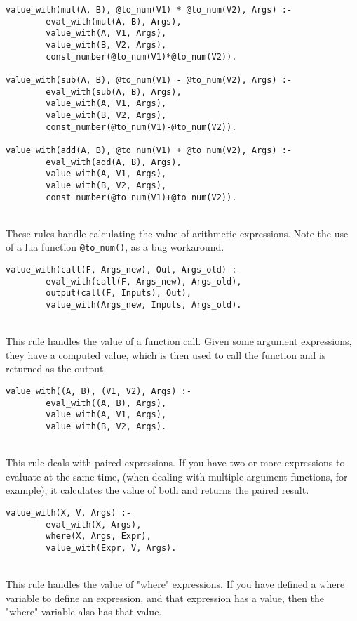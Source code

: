 \begin{lstlisting}
value_with(mul(A, B), @to_num(V1) * @to_num(V2), Args) :- 
		eval_with(mul(A, B), Args), 
		value_with(A, V1, Args), 
		value_with(B, V2, Args), 
		const_number(@to_num(V1)*@to_num(V2)).
		
value_with(sub(A, B), @to_num(V1) - @to_num(V2), Args) :- 
		eval_with(sub(A, B), Args), 
		value_with(A, V1, Args), 
		value_with(B, V2, Args), 
		const_number(@to_num(V1)-@to_num(V2)).
		
value_with(add(A, B), @to_num(V1) + @to_num(V2), Args) :- 
		eval_with(add(A, B), Args), 
		value_with(A, V1, Args), 
		value_with(B, V2, Args), 
		const_number(@to_num(V1)+@to_num(V2)).
\end{lstlisting}
\mbox{} \\
These rules handle calculating the value of arithmetic expressions. Note the use of a lua function \lstinline{@to_num()}, as a bug workaround. \\%

\begin{lstlisting}
value_with(call(F, Args_new), Out, Args_old) :- 
		eval_with(call(F, Args_new), Args_old), 
		output(call(F, Inputs), Out), 
		value_with(Args_new, Inputs, Args_old).
\end{lstlisting}
\mbox{} \\
This rule handles the value of a function call. Given some argument expressions, they have a computed value, which is then used to call the function and is returned as the output. \\

\begin{lstlisting}
value_with((A, B), (V1, V2), Args) :- 
		eval_with((A, B), Args), 
		value_with(A, V1, Args), 
		value_with(B, V2, Args).
\end{lstlisting}
\mbox{} \\
This rule deals with paired expressions. If you have two or more expressions to evaluate at the same time, (when dealing with multiple-argument functions, for example), it calculates the value of both and returns the paired result. \\

\begin{lstlisting}
value_with(X, V, Args) :- 
		eval_with(X, Args), 
		where(X, Args, Expr), 
		value_with(Expr, V, Args).
\end{lstlisting}
\mbox{} \\
This rule handles the value of "where" expressions. If you have defined a where variable to define an expression, and that expression has a value, then the "where" variable also has that value.\\

